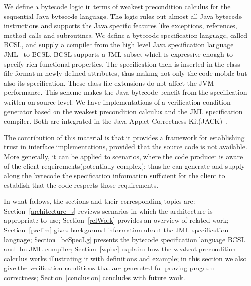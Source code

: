 We define a bytecode logic in terms of weakest precondition calculus for the sequential Java bytecode language. The logic rules out 
almost all Java bytecode instructions and supports the Java specific features like 
exceptions, references, method calls and subroutines.  
 We define a bytecode specification language, called BCSL, and supply a compiler from 
 the high level Java specification language JML~\cite{JMLRefMan} to BCSL. 
 BCSL supports a JML subset which is expressive enough to specify rich functional properties. The specification then is 
 inserted in the class file format in newly defined attributes, thus making not only the code mobile but also its specification. These class
 file extensions do not affect the JVM performance. This scheme makes the Java bytecode benefit from the specification written on source level.
 We have implementations of a verification condition generator based on the weakest precondition calculus and the JML specification compiler. Both are integrated in the Java Applet Correctness Kit(JACK)~\cite{BRL-JACK}. 

The contribution of this material is that it provides a framework for establishing trust in interface implementations, 
provided that the source code is not available. More generally, it can be applied to scenarios, where the code producer is 
aware of the client requirements(potentially complex); thus he can generate and supply along the bytecode the 
specification information sufficient for the client to establish that the code respects those requirements.   

  
In what follows, the sections and their corresponding topics are: 
Section~\ref{architecture_s} reviews scenarios in which the architecture is appropriate to use; Section~\ref{relWork} provides an 
overview of related work; Section~\ref{prelim} gives background information about the JML specification language;  Section~\ref{bcSpecLg} presents the bytecode 
specification language BCSL and the JML compiler; Section~\ref{wpbc} explains how the weakest precondition calculus works illustrating it with definitions and example; in this section we also give the verification conditions that are generated for 
proving program correctness;%
Section~\ref{conclusion} concludes with future work.  















